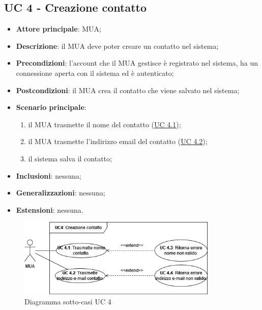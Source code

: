 \subsection{UC 4 - Creazione contatto} \label{sec:UC4}
    \begin{itemize}
        \item \textbf{Attore principale}: MUA;
        \item \textbf{Descrizione}: il MUA deve poter creare un contatto nel sistema;
        \item \textbf{Precondizioni}: l’account che il MUA gestisce è registrato nel sistema, ha un connessione aperta con il sistema ed è autenticato;
        \item \textbf{Postcondizioni}: il MUA crea il contatto che viene salvato nel sistema;
        \item \textbf{Scenario principale}:
            \begin{enumerate}
                \item il MUA trasmette il nome del contatto (\hyperref[sec:UC4.1]{UC 4.1});
                \item il MUA trasmette l'indirizzo email del contatto (\hyperref[sec:UC4.2]{UC 4.2});
                \item il sistema salva il contatto;
            \end{enumerate}
        \item \textbf{Inclusioni}: nessuna;
        \item \textbf{Generalizzazioni}: nessuna;
        \item \textbf{Estensioni}: nessuna.
    \end{itemize}

\begin{figure}[H]
    \includegraphics[width=0.85\textwidth]{sections/uc_imgs/UC04.png}
    \centering
    \caption{Diagramma sotto-casi UC 4}
\end{figure}

